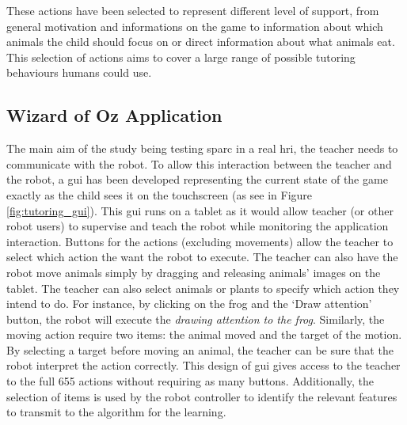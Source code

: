 These actions have been selected to represent different level of support, from general motivation and informations on the game to information about which animals the child should focus on or direct information about what animals eat. This selection of actions aims to cover a large range of possible tutoring behaviours humans could use. 

\subsection{Wizard of Oz Application}

The main aim of the study being testing \gls{sparc} in a real \gls{hri}, the teacher needs to communicate with the robot. To allow this interaction between the teacher and the robot, a \gls{gui} has been developed representing the current state of the game exactly as the child sees it on the touchscreen (as see in Figure \ref{fig:tutoring_gui}). This \gls{gui} runs on a tablet as it would allow teacher (or other robot users) to supervise and teach the robot while monitoring the application interaction. Buttons for the actions (excluding movements) allow the teacher to select which action the want the robot to execute. The teacher can also have the robot move animals simply by dragging and releasing animals' images on the tablet. The teacher can also select animals or plants to specify which action they intend to do. For instance, by clicking on the frog and the `Draw attention' button, the robot will execute the \textit{drawing attention to the frog}. Similarly, the moving action require two items: the animal moved and the target of the motion. By selecting a target before moving an animal, the teacher can be sure that the robot interpret the action correctly. This design of \gls{gui} gives access to the teacher to the full 655 actions without requiring as many buttons. Additionally, the selection of items is used by the robot controller to identify the relevant features to transmit to the algorithm for the learning.



